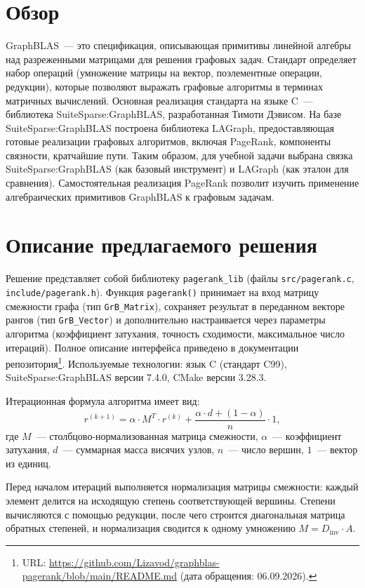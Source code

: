 \documentclass[a4paper]{article}
\begin{document}
\section{Обзор}
GraphBLAS~--- это спецификация, описывающая примитивы линейной алгебры над разреженными матрицами для решения графовых задач. Стандарт определяет набор операций (умножение матрицы на вектор, поэлементные операции, редукции), которые позволяют выражать графовые алгоритмы в терминах матричных вычислений. Основная реализация стандарта на языке C~--- библиотека SuiteSparse:GraphBLAS, разработанная Тимоти Дэвисом.
На базе SuiteSparse:GraphBLAS построена библиотека LAGraph, предоставляющая готовые реализации графовых алгоритмов, включая PageRank, компоненты связности, кратчайшие пути.
Таким образом, для учебной задачи выбрана связка SuiteSparse:GraphBLAS (как базовый инструмент) и LAGraph (как эталон для сравнения). Самостоятельная реализация PageRank позволит изучить применение алгебраических примитивов GraphBLAS к графовым задачам.
\section{Описание предлагаемого решения}

Решение представляет собой библиотеку \texttt{pagerank\_lib} (файлы \texttt{src/pagerank.c}, \texttt{include/pagerank.h}). Функция \texttt{pagerank()} принимает на вход матрицу смежности графа (тип \texttt{GrB\_Matrix}), сохраняет результат в переданном векторе рангов (тип \texttt{GrB\_Vector}) и дополнительно настраивается через параметры алгоритма (коэффициент затухания, точность сходимости, максимальное число итераций). Полное описание интерфейса приведено в документации репозитория\footnote{URL: \url{https://github.com/Lizavod/graphblas-pagerank/blob/main/README.md} (дата обращения: 06.09.2026).}. Используемые технологии: язык C (стандарт C99), SuiteSparse:GraphBLAS версии 7.4.0, CMake версии 3.28.3.

Итерационная формула алгоритма имеет вид:
\begin{equation}
r^{(k+1)} = \alpha \cdot M^T \cdot r^{(k)} + \frac{\alpha \cdot d + (1 - \alpha)}{n} \cdot 1,
\end{equation}
где $M$~--- столбцово-нормализованная матрица смежности, $\alpha$~--- коэффициент затухания, $d$~--- суммарная масса висячих узлов, $n$~--- число вершин, $1$~--- вектор из единиц.

Перед началом итераций выполняется нормализация матрицы смежности: каждый элемент делится на исходящую степень соответствующей вершины. Степени вычисляются с помощью редукции, после чего строится диагональная матрица обратных степеней, и нормализация сводится к одному умножению $M = D_{\text{inv}} \cdot A$.
\end{document}
